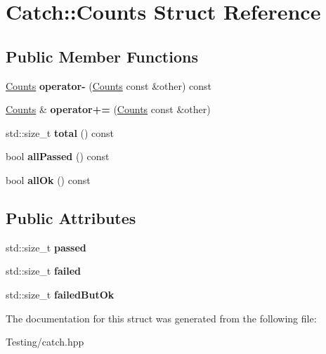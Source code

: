 \hypertarget{struct_catch_1_1_counts}{\section{Catch\-:\-:Counts Struct Reference}
\label{struct_catch_1_1_counts}
}
\subsection*{Public Member Functions}
\begin{DoxyCompactItemize}
\item 
\hypertarget{struct_catch_1_1_counts_aedf86fefe33938d132a6981171cd83e6}{\hyperlink{struct_catch_1_1_counts}{Counts} {\bfseries operator-\/} (\hyperlink{struct_catch_1_1_counts}{Counts} const \&other) const }\label{struct_catch_1_1_counts_aedf86fefe33938d132a6981171cd83e6}

\item 
\hypertarget{struct_catch_1_1_counts_a322a89475cd2cc039140ef371e973677}{\hyperlink{struct_catch_1_1_counts}{Counts} \& {\bfseries operator+=} (\hyperlink{struct_catch_1_1_counts}{Counts} const \&other)}\label{struct_catch_1_1_counts_a322a89475cd2cc039140ef371e973677}

\item 
\hypertarget{struct_catch_1_1_counts_a9125c662e30114e5c5cc94729b1e9e84}{std\-::size\-\_\-t {\bfseries total} () const }\label{struct_catch_1_1_counts_a9125c662e30114e5c5cc94729b1e9e84}

\item 
\hypertarget{struct_catch_1_1_counts_adbbaca552f6017ce69e0d5dc5500bea4}{bool {\bfseries all\-Passed} () const }\label{struct_catch_1_1_counts_adbbaca552f6017ce69e0d5dc5500bea4}

\item 
\hypertarget{struct_catch_1_1_counts_ab2497c9dfc77be757a90225ea69595f5}{bool {\bfseries all\-Ok} () const }\label{struct_catch_1_1_counts_ab2497c9dfc77be757a90225ea69595f5}

\end{DoxyCompactItemize}
\subsection*{Public Attributes}
\begin{DoxyCompactItemize}
\item 
\hypertarget{struct_catch_1_1_counts_ad28daaf3de28006400208b6dd0c631e6}{std\-::size\-\_\-t {\bfseries passed}}\label{struct_catch_1_1_counts_ad28daaf3de28006400208b6dd0c631e6}

\item 
\hypertarget{struct_catch_1_1_counts_a19982a3817a3bc2c07f0290e71f497a3}{std\-::size\-\_\-t {\bfseries failed}}\label{struct_catch_1_1_counts_a19982a3817a3bc2c07f0290e71f497a3}

\item 
\hypertarget{struct_catch_1_1_counts_ac090973a2ff51394cd452718e75c073e}{std\-::size\-\_\-t {\bfseries failed\-But\-Ok}}\label{struct_catch_1_1_counts_ac090973a2ff51394cd452718e75c073e}

\end{DoxyCompactItemize}


The documentation for this struct was generated from the following file\-:\begin{DoxyCompactItemize}
\item 
Testing/catch.\-hpp\end{DoxyCompactItemize}
